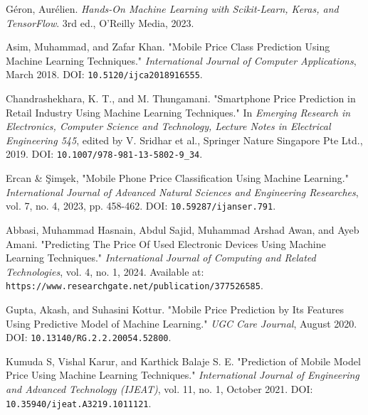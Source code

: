 \documentclass[12pt]{report}
\begin{document}
\renewcommand{\bibname}{References}
\begin{thebibliography}{9}
	Géron, Aurélien. \textit{Hands-On Machine Learning with Scikit-Learn, Keras, and TensorFlow}. 3rd ed., O'Reilly Media, 2023.

	Asim, Muhammad, and Zafar Khan. "Mobile Price Class Prediction Using Machine Learning Techniques." \textit{International Journal of Computer Applications}, March 2018. DOI: \texttt{10.5120/ijca2018916555}.

	Chandrashekhara, K. T., and M. Thungamani. "Smartphone Price Prediction in Retail Industry Using Machine Learning Techniques." In \textit{Emerging Research in Electronics, Computer Science and Technology, Lecture Notes in Electrical Engineering 545}, edited by V. Sridhar et al., Springer Nature Singapore Pte Ltd., 2019. DOI: \texttt{10.1007/978-981-13-5802-9\_34}.

	Ercan \&  Şimşek, "Mobile Phone Price Classification Using Machine Learning." \textit{International Journal of Advanced Natural Sciences and Engineering Researches}, vol. 7, no. 4, 2023, pp. 458-462. DOI: \texttt{10.59287/ijanser.791}.

	Abbasi, Muhammad Hasnain, Abdul Sajid, Muhammad Arshad Awan, and Ayeb Amani. "Predicting The Price Of Used Electronic Devices Using Machine Learning Techniques." \textit{International Journal of Computing and Related Technologies}, vol. 4, no. 1, 2024. Available at: \texttt{https://www.researchgate.net/publication/377526585}.

	Gupta, Akash, and Suhasini Kottur. "Mobile Price Prediction by Its Features Using Predictive Model of Machine Learning." \textit{UGC Care Journal}, August 2020. DOI: \texttt{10.13140/RG.2.2.20054.52800}.

	Kumuda S, Vishal Karur, and Karthick Balaje S. E. "Prediction of Mobile Model Price Using Machine Learning Techniques." \textit{International Journal of Engineering and Advanced Technology (IJEAT)}, vol. 11, no. 1, October 2021. DOI: \texttt{10.35940/ijeat.A3219.1011121}.

\end{thebibliography}
\end{document}
